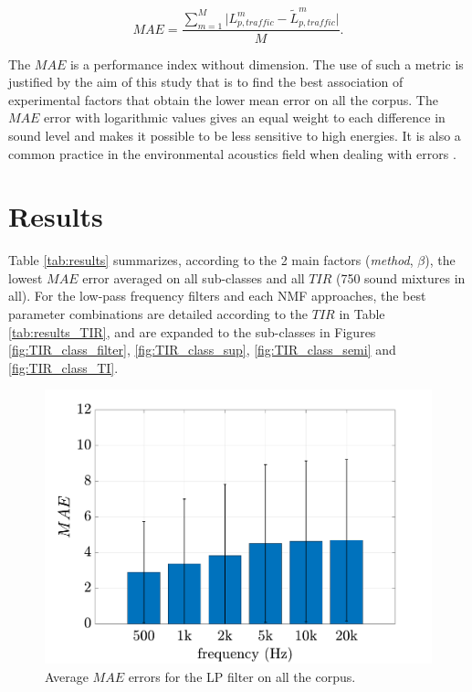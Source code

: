 \documentclass[twocolumn]{svjour3}          %
\begin{document}
\begin{equation}
MAE = \frac{\sum_{m = 1}^M\vert L^m_{p,traffic}-\tilde{L}^m_{p,traffic} \vert}{M}.
\end{equation}

The $MAE$ is a performance index without dimension. The use of such a metric is justified by the aim of this study that is to find the best association of experimental factors that obtain the lower mean error on all the corpus. The $MAE$ error with logarithmic values gives an equal weight to each difference in sound level and makes it possible to be less sensitive to high energies. It is also a common practice in the environmental acoustics field when dealing with errors  \cite{morillas2014uncertainty} \cite{aumond2018kriging}.

\section{Results}\label{part:results}

Table \ref{tab:results} summarizes, according to the 2 main factors (\textit{method}, $\beta$), the lowest $MAE$ error averaged on all sub-classes and all $TIR$ (750 sound mixtures in all). For the low-pass frequency filters and each NMF approaches, the best parameter combinations are detailed according to the $TIR$ in Table \ref{tab:results_TIR},  and are expanded to the sub-classes in Figures \ref{fig:TIR_class_filter}, \ref{fig:TIR_class_sup}, \ref{fig:TIR_class_semi} and \ref{fig:TIR_class_TI}. \\

\begin{figure}[t]
\centering
\includegraphics[width=\linewidth]{./figures/filter_bar_integrate.pdf}
\caption{Average $MAE$ errors for the LP filter on all the corpus.}
\label{fig:filter_intergate}
\end{figure}
\end{document}
